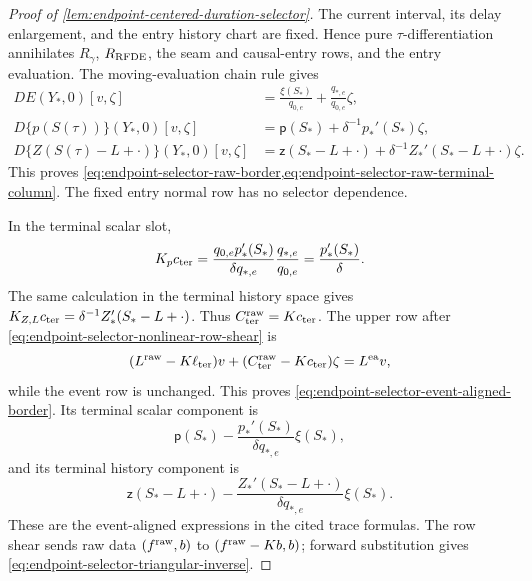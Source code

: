 \begin{proof}[Proof of
\cref{lem:endpoint-centered-duration-selector}]
The current interval, its delay enlargement, and the entry history chart
are fixed.  Hence pure \(\tau\)-differentiation annihilates
\(R_\gamma\), \(R_{\rm RFDE}\), the seam and causal-entry rows, and the
entry evaluation.  The moving-evaluation chain rule gives
\begin{align*}
 D E(Y_*,0)[v,\zeta]
 &=\frac{\xi(S_*)}{q_{0,e}}
   +\frac{q_{*,e}}{q_{0,e}}\zeta,\\
 D\{p(S(\tau))\}(Y_*,0)[v,\zeta]
 &=\mathsf p(S_*)+\delta^{-1}p_*'(S_*)\zeta,\\
 D\{Z(S(\tau)-L+\cdot)\}(Y_*,0)[v,\zeta]
 &=\mathsf z(S_*-L+\cdot)
   +\delta^{-1}Z_*'(S_*-L+\cdot)\zeta.
\end{align*}
This proves
\cref{eq:endpoint-selector-raw-border,eq:endpoint-selector-raw-terminal-column}.
The fixed entry normal row has no selector dependence.

In the terminal scalar slot,
\begin{equation*}
 K_pc_{\rm ter}
 =\frac{q_{0,e}p_*'(S_*)}{\delta q_{*,e}}
       \frac{q_{*,e}}{q_{0,e}}
 =\frac{p_*'(S_*)}{\delta}.
\end{equation*}
The same calculation in the terminal history space gives
\(K_{Z,L}c_{\rm ter}=\delta^{-1}Z_*'(S_*-L+\cdot)\).
Thus \(C_{\rm ter}^{\rm raw}=Kc_{\rm ter}\).  The upper row after
\cref{eq:endpoint-selector-nonlinear-row-shear} is
\begin{equation*}
 (L^{\rm raw}-K\ell_{\rm ter})v
 +(C_{\rm ter}^{\rm raw}-Kc_{\rm ter})\zeta
 =L^{\rm ea}v,
\end{equation*}
while the event row is unchanged.  This proves
\cref{eq:endpoint-selector-event-aligned-border}.  Its terminal scalar
component is
\begin{equation*}
 \mathsf p(S_*)
 -\frac{p_*'(S_*)}{\delta q_{*,e}}\xi(S_*),
\end{equation*}
and its terminal history component is
\begin{equation*}
 \mathsf z(S_*-L+\cdot)
 -\frac{Z_*'(S_*-L+\cdot)}{\delta q_{*,e}}\xi(S_*).
\end{equation*}
These are the event-aligned expressions in the cited trace formulas.  The
row shear sends raw data \((f^{\rm raw},b)\) to
\((f^{\rm raw}-Kb,b)\); forward substitution gives
\cref{eq:endpoint-selector-triangular-inverse}.


\end{proof}
